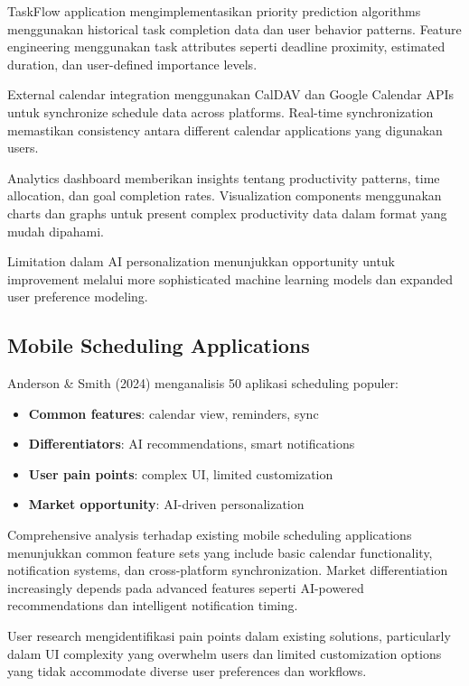 TaskFlow application mengimplementasikan priority prediction algorithms menggunakan historical task completion data dan user behavior patterns. Feature engineering menggunakan task attributes seperti deadline proximity, estimated duration, dan user-defined importance levels.

External calendar integration menggunakan CalDAV dan Google Calendar APIs untuk synchronize schedule data across platforms. Real-time synchronization memastikan consistency antara different calendar applications yang digunakan users.

Analytics dashboard memberikan insights tentang productivity patterns, time allocation, dan goal completion rates. Visualization components menggunakan charts dan graphs untuk present complex productivity data dalam format yang mudah dipahami.

Limitation dalam AI personalization menunjukkan opportunity untuk improvement melalui more sophisticated machine learning models dan expanded user preference modeling.

\subsection{Mobile Scheduling Applications}

Anderson \& Smith (2024) menganalisis 50 aplikasi scheduling populer:

\begin{itemize}
\item \textbf{Common features}: calendar view, reminders, sync
\item \textbf{Differentiators}: AI recommendations, smart notifications
\item \textbf{User pain points}: complex UI, limited customization
\item \textbf{Market opportunity}: AI-driven personalization
\end{itemize}

Comprehensive analysis terhadap existing mobile scheduling applications menunjukkan common feature sets yang include basic calendar functionality, notification systems, dan cross-platform synchronization. Market differentiation increasingly depends pada advanced features seperti AI-powered recommendations dan intelligent notification timing.

User research mengidentifikasi pain points dalam existing solutions, particularly dalam UI complexity yang overwhelm users dan limited customization options yang tidak accommodate diverse user preferences dan workflows.

